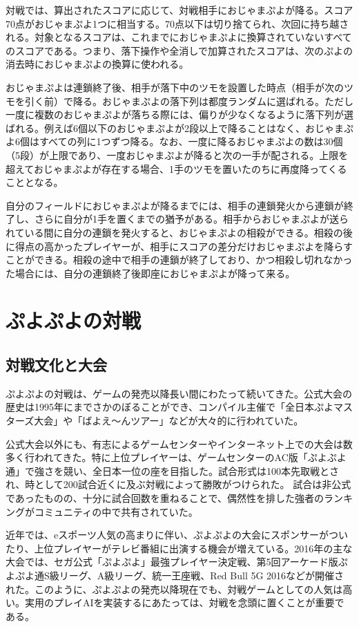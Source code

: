 \documentclass[12pt]{jsarticle}
\begin{document}
対戦では、算出されたスコアに応じて、対戦相手におじゃまぷよが降る。スコア70点がおじゃまぷよ1つに相当する。70点以下は切り捨てられ、次回に持ち越される。対象となるスコアは、これまでにおじゃまぷよに換算されていないすべてのスコアである。つまり、落下操作や全消しで加算されたスコアは、次のぷよの消去時におじゃまぷよの換算に使われる。

おじゃまぷよは連鎖終了後、相手が落下中のツモを設置した時点（相手が次のツモを引く前）で降る。おじゃまぷよの落下列は都度ランダムに選ばれる。ただし一度に複数のおじゃまぷよが落ちる際には、偏りが少なくなるように落下列が選ばれる。例えば6個以下のおじゃまぷよが2段以上で降ることはなく、おじゃまぷよ6個はすべての列に1つずつ降る。なお、一度に降るおじゃまぷよの数は30個（5段）が上限であり、一度おじゃまぷよが降ると次の一手が配される。上限を超えておじゃまぷよが存在する場合、1手のツモを置いたのちに再度降ってくることとなる。

自分のフィールドにおじゃまぷよが降るまでには、相手の連鎖発火から連鎖が終了し、さらに自分が1手を置くまでの猶予がある。相手からおじゃまぷよが送られている間に自分の連鎖を発火すると、おじゃまぷよの相殺ができる。相殺の後に得点の高かったプレイヤーが、相手にスコアの差分だけおじゃまぷよを降らすことができる。相殺の途中で相手の連鎖が終了しており、かつ相殺し切れなかった場合には、自分の連鎖終了後即座におじゃまぷよが降って来る。

\section{ぷよぷよの対戦}
\subsection{対戦文化と大会}
ぷよぷよの対戦は、ゲームの発売以降長い間にわたって続いてきた。公式大会の歴史は1995年にまでさかのぼることができ、コンパイル主催で「全日本ぷよマスターズ大会」や「ばよえ～んツアー」などが大々的に行われていた。

公式大会以外にも、有志によるゲームセンターやインターネット上での大会は数多く行われてきた。特に上位プレイヤーは、ゲームセンターのAC版「ぷよぷよ通」で強さを競い、全日本一位の座を目指した。試合形式は100本先取戦とされ、時として200試合近くに及ぶ対戦によって勝敗がつけられた。
試合は非公式であったものの、十分に試合回数を重ねることで、偶然性を排した強者のランキングがコミュニティの中で共有されていた。

近年では、eスポーツ人気の高まりに伴い、ぷよぷよの大会にスポンサーがついたり、上位プレイヤーがテレビ番組に出演する機会が増えている。2016年の主な大会では、セガ公式「ぷよぷよ」最強プレイヤー決定戦\cite{sega}、第5回アーケード版ぷよぷよ通S級リーグ\cite{Skyuu}、A級リーグ\cite{Akyuu}、統一王座戦\cite{touituouza}、Red Bull 5G 2016\cite{5g}などが開催された。このように、ぷよぷよの発売以降現在でも、対戦ゲームとしての人気は高い。実用のプレイAIを実装するにあたっては、対戦を念頭に置くことが重要である。
\end{document}
